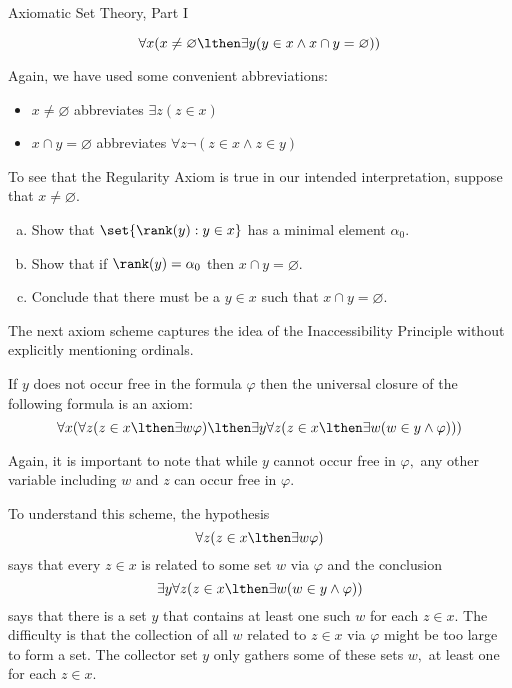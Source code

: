 \begin{unit}{Axiomatic Set Theory, Part I}
\begin{axiom}[Regularity]
  \[\forall x (x \neq \varnothing \lthen \exists y (y \in x \land x \cap y = \varnothing))\]
\end{axiom}

\noindent
Again, we have used some convenient abbreviations:
\begin{itemize}
\item \(x \neq \varnothing\) abbreviates \(\exists z (z \in x)\)
\item \(x \cap y = \varnothing\) abbreviates \(\forall z \lnot(z \in x \land z \in y)\)
\end{itemize}

\begin{problem}
To see that the Regularity Axiom is true in our intended interpretation, suppose that \(x \neq \varnothing.\)
\begin{enumerate}[(a)]
\item Show that \(\set{\rank(y) : y \in x}\) has a minimal element \(\alpha_0.\)
\item Show that if \(\rank(y) = \alpha_0\) then \(x \cap y = \varnothing.\)
\item Conclude that there must be a \(y \in x\) such that \(x \cap y = \varnothing.\)
\end{enumerate}
\end{problem}

The next axiom scheme captures the idea of the Inaccessibility Principle without explicitly mentioning ordinals.

\begin{axiom}
  If \(y\) does not occur free in the formula \(\varphi\) then the universal closure of the following formula is an axiom:
  \[\forall x (\forall z (z \in x \lthen \exists w \varphi) \lthen \exists y \forall z (z \in x \lthen \exists w(w \in y \land \varphi)))\]
\end{axiom}

\noindent
Again, it is important to note that while \(y\) cannot occur free in \(\varphi,\) any other variable including \(w\) and \(z\) can occur free in \(\varphi.\)

To understand this scheme, the hypothesis \[\forall z (z \in x \lthen \exists w \varphi)\] says that every \(z \in x\) is related to some set \(w\) via \(\varphi\) and the conclusion \[\exists y \forall z (z \in x \lthen \exists w(w \in y \land \varphi))\] says that there is a set \(y\) that contains at least one such \(w\) for each \(z \in x.\)
The difficulty is that the collection of all \(w\) related to \(z \in x\) via \(\varphi\) might be too large to form a set.
The collector set \(y\) only gathers some of these sets \(w,\) at least one for each \(z \in x.\)


\end{unit}
